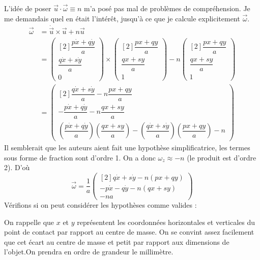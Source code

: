 \documentclass[12pt,a4paper]{article}
\begin{document}
	L'idée de poser $\vec{u}\cdot\vec{\omega}\equiv n$ m'a posé pas mal de problèmes de compréhension. Je me demandais quel en était l'intérêt, jusqu'à ce que je calcule explicitement $\vec{\omega}$.\\
	\bgroup
	\addtolength{\jot}{5pt}
	\begin{align*}
	\vec{\omega} &= \dot{\vec{u}}\times\vec{u}+n\vec{u}\\
	&=\begin{pmatrix}[2]\dfrac{p\dot{x}+q\dot{y}}{a}\\\dfrac{q\dot{x}+s\dot{y}}{a}\\0\end{pmatrix} \times \begin{pmatrix}[2]\dfrac{px+qy}{a}\\\dfrac{qx+sy}{a}\\1\end{pmatrix} -n\begin{pmatrix}[2]\dfrac{px+qy}{a}\\\dfrac{qx+sy}{a}\\1\end{pmatrix}\\
	&=\begin{pmatrix}[2]
	\dfrac{q\dot{x}+s\dot{y}}{a}-n\dfrac{px+qy}{a}\\
	-\dfrac{p\dot{x}+q\dot{y}}{a}-n\dfrac{qx+sy}{a}\\
	\left(\dfrac{p\dot{x}+q\dot{y}}{a}\right)  \left(\dfrac{qx+sy}{a}\right)  - \left(\dfrac{q\dot{x}+s\dot{y}}{a}\right)  \left( \dfrac{px+qy}{a}\right)  - n
	\end{pmatrix}
	\end{align*}
	Il semblerait que les auteurs aient fait une hypothèse simplificatrice, les termes sous forme de fraction sont d'ordre 1. On a donc $\omega_z\approx-n$ (le produit est d'ordre 2). D'où
	\begin{equation}
	\vec{\omega}=\dfrac{1}{a}\begin{pmatrix}[2]
	q\dot{x}+s\dot{y}-n(px+qy)\\
	-p\dot{x}-q\dot{y}-n(qx+sy)\\
	- na
	\end{pmatrix}
	\end{equation}
	\egroup
	Vérifions si on peut considérer les hypothèses comme valides :
	
	
	On rappelle que $x$ et $y$ représentent les coordonnées horizontales et verticales du point de contact par rapport au centre de masse. On se convint assez facilement que cet écart au centre de masse et petit par rapport aux dimensions de l'objet.On prendra en ordre de grandeur le millimètre.
	
\end{document}
